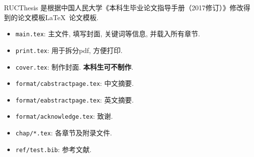 \begin{abstractzh}
RUCThesis 是根据中国人民大学《本科生毕业论文指导手册（2017修订）》修改得到的论文模板\LaTeX\ 论文模板. 
\begin{itemize}
\item {\tt main.tex}: 主文件, 填写封面, 关键词等信息, 并载入所有章节.
\item {\tt print.tex}: 用于拆分pdf, 方便打印.
\item {\tt cover.tex}: 制作封面. \textbf{本科生可不制作}.
\item {\tt format/cabstractpage.tex}: 中文摘要.
\item {\tt format/eabstractpage.tex}: 英文摘要.
\item {\tt format/acknowledge.tex}: 致谢.
\item {\tt chap/*.tex}: 各章节及附录文件.
\item {\tt ref/test.bib}: 参考文献.
\end{itemize}
\end{abstractzh}